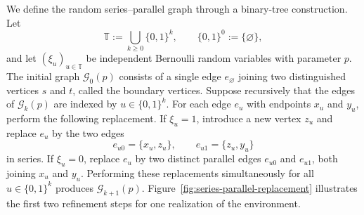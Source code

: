\documentclass[12pt,preprint]{amsart}
\numberwithin{equation}{section}
\theoremstyle{plain}
\theoremstyle{definition}
\begin{document}
We define the random series--parallel graph through a binary-tree
construction.  Let
\[
 \mathbb T:=\bigcup_{k\ge0}\{0,1\}^k,
 \qquad \{0,1\}^0:=\{\varnothing\},
\]
and let $(\xi_u)_{u\in\mathbb T}$ be independent Bernoulli random variables
with parameter $p$.  The initial graph $\mathcal G_0(p)$ consists of a
single edge $e_{\varnothing}$ joining two distinguished vertices $s$ and
$t$, called the boundary vertices.  Suppose recursively that the edges of
$\mathcal G_k(p)$ are indexed by $u\in\{0,1\}^k$.  For each edge $e_u$ with
endpoints $x_u$ and $y_u$, perform the following replacement.  If
$\xi_u=1$, introduce a new vertex $z_u$ and replace $e_u$ by the two edges
\[
 e_{u0}=\{x_u,z_u\},
 \qquad
 e_{u1}=\{z_u,y_u\}
\]
in series.  If $\xi_u=0$, replace $e_u$ by two distinct parallel edges
$e_{u0}$ and $e_{u1}$, both joining $x_u$ and $y_u$.  Performing these
replacements simultaneously for all $u\in\{0,1\}^k$ produces
$\mathcal G_{k+1}(p)$.  Figure~\ref{fig:series-parallel-replacement}
illustrates the first two refinement steps for one realization of the
environment.
\end{document}
